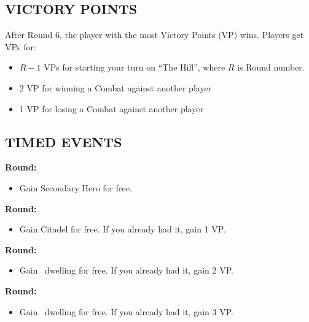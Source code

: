 \begin{multicols}{2}
\subsection*{\MakeUppercase{Victory Points}}
After Round 6, the player with the most Victory Points (VP) wins.
Players get VPs for:
\begin{itemize}
  \item $R-1$ VPs for starting your turn on ``The Hill'', where $R$ is Round number.
  \item 2 VP for winning a Combat against another player
  \item 1 VP for losing a Combat against another player
\end{itemize}

\subsection*{\MakeUppercase{Timed Events}}

\textbf{ Round:}
\begin{itemize}
  \item Gain Secondary Hero for free.
\end{itemize}
\textbf{ Round:}
\begin{itemize}
  \item Gain Citadel for free. If you already had it, gain 1 VP.
\end{itemize}
\textbf{ Round:}
\begin{itemize}
  \item Gain \silver\ dwelling for free. If you already had it, gain 2 VP.
\end{itemize}
\textbf{ Round:}
\begin{itemize}
  \item Gain \golden\ dwelling for free. If you already had it, gain 3 VP.
\end{itemize}


\end{multicols}
